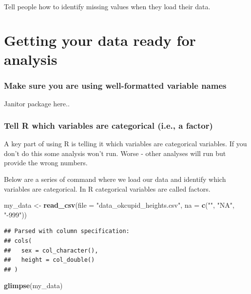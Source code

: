 \documentclass[
]{krantz}
\makeatletter
\newenvironment{Shaded}{\begin{snugshade}}{\end{snugshade}}
\newcommand{\DataTypeTok}[1]{\textcolor[rgb]{0.27,0.27,0.27}{#1}}
\newcommand{\KeywordTok}[1]{\textcolor[rgb]{0.27,0.27,0.27}{\textbf{#1}}}
\newcommand{\NormalTok}[1]{#1}
\newcommand{\StringTok}[1]{\textcolor[rgb]{0.5,0.5,0.5}{#1}}
\newenvironment{kframe}{%
\medskip{}
\setlength{\fboxsep}{.8em}
 \def\at@end@of@kframe{}%
 \ifinner\ifhmode%
  \def\at@end@of@kframe{\end{minipage}}%
  \begin{minipage}{\columnwidth}%
 \fi\fi%
 \def\FrameCommand##1{\hskip\@totalleftmargin \hskip-\fboxsep
 \colorbox{shadecolor}{##1}\hskip-\fboxsep
     \hskip-\linewidth \hskip-\@totalleftmargin \hskip\columnwidth}%
 \MakeFramed {\advance\hsize-\width
   \@totalleftmargin\z@ \linewidth\hsize
   \@setminipage}}%
 {\par\unskip\endMakeFramed%
 \at@end@of@kframe}
\renewenvironment{Shaded}{\begin{kframe}}{\end{kframe}}
\makeatother
\begin{document}
Tell people how to identify missing values when they load their data.

\hypertarget{getting-your-data-ready-for-analysis}{%
\section{Getting your data ready for analysis}\label{getting-your-data-ready-for-analysis}}

\hypertarget{make-sure-you-are-using-well-formatted-variable-names}{%
\subsubsection{Make sure you are using well-formatted variable names}\label{make-sure-you-are-using-well-formatted-variable-names}}

Janitor package here..

\hypertarget{tell-r-which-variables-are-categorical-i.e.-a-factor}{%
\subsubsection{Tell R which variables are categorical (i.e., a factor)}\label{tell-r-which-variables-are-categorical-i.e.-a-factor}}

A key part of using R is telling it which variables are categorical variables. If you don't do this some analysis won't run. Worse - other analyses will run but provide the wrong numbers.

Below are a series of command where we load our data and identify which variables are categorical. In R categorical variables are called factors.

\begin{Shaded}
\begin{Highlighting}[]
\NormalTok{my_data <-}\StringTok{ }\KeywordTok{read_csv}\NormalTok{(}\DataTypeTok{file =} \StringTok{"data_okcupid_heights.csv"}\NormalTok{, }
                    \DataTypeTok{na =} \KeywordTok{c}\NormalTok{(}\StringTok{""}\NormalTok{, }\StringTok{"NA"}\NormalTok{, }\StringTok{"-999"}\NormalTok{))}
\end{Highlighting}
\end{Shaded}

\begin{verbatim}
## Parsed with column specification:
## cols(
##   sex = col_character(),
##   height = col_double()
## )
\end{verbatim}

\begin{Shaded}
\begin{Highlighting}[]
\KeywordTok{glimpse}\NormalTok{(my_data)}
\end{Highlighting}
\end{Shaded}
\end{document}
